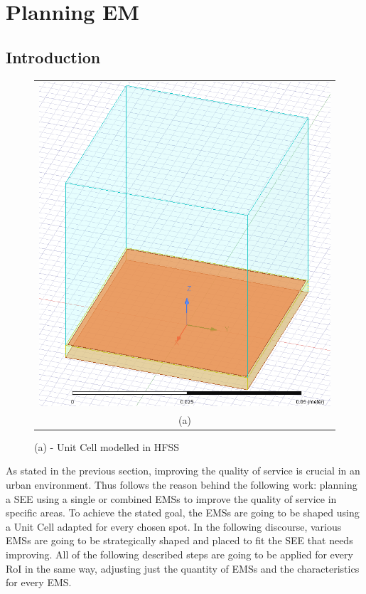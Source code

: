 \vspace{-30pt}
\chapter{Planning EM}
\section{Introduction}
\begin{figure}
\vspace{-50pt}
  \begin{center}
    \begin{tabular}{c}
\includegraphics[scale=0.35]{./Figure/Planning.EM/UnitCell.png}\tabularnewline
(a)\tabularnewline
\end{tabular}
\caption{\footnotesize (a) - Unit Cell modelled in HFSS}
  \end{center}
  
\end{figure}
As stated in the previous section, improving the quality of service
is crucial in an urban environment. Thus follows the reason behind
the following work: planning a SEE using a single or combined EMSs
to improve the quality of service in specific areas. To achieve the
stated goal, the EMSs are going to be shaped using a Unit Cell adapted
for every chosen spot. 
In the following discourse, various EMSs are going to be strategically
shaped and placed to fit the SEE that needs improving. 
All of the following described steps are going to be applied for every
RoI in the same way, adjusting just the quantity of EMSs and the characteristics
for every EMS.
\vspace{10pt}
